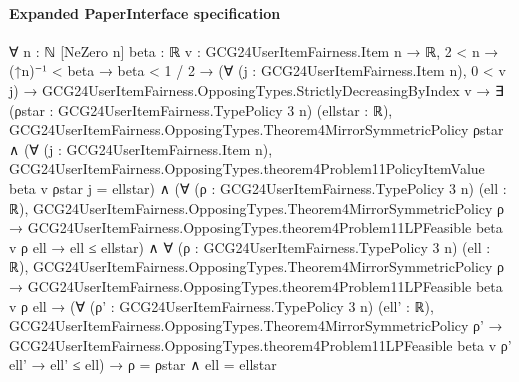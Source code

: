 \documentclass[10pt]{article}
\begin{document}
\paragraph{Expanded PaperInterface specification}
\begin{ReviewVerbatim}
∀ {n : ℕ} [NeZero n] {beta : ℝ} {v : GCG24UserItemFairness.Item n → ℝ},
  2 < n →
    (↑n)⁻¹ < beta →
      beta < 1 / 2 →
        (∀ (j : GCG24UserItemFairness.Item n), 0 < v j) →
          GCG24UserItemFairness.OpposingTypes.StrictlyDecreasingByIndex v →
            ∃ (ρstar : GCG24UserItemFairness.TypePolicy 3 n) (ellstar : ℝ),
              GCG24UserItemFairness.OpposingTypes.Theorem4MirrorSymmetricPolicy ρstar ∧
                (∀ (j : GCG24UserItemFairness.Item n),
                    GCG24UserItemFairness.OpposingTypes.theorem4Problem11PolicyItemValue beta v ρstar j = ellstar) ∧
                  (∀ (ρ : GCG24UserItemFairness.TypePolicy 3 n) (ell : ℝ),
                      GCG24UserItemFairness.OpposingTypes.Theorem4MirrorSymmetricPolicy ρ →
                        GCG24UserItemFairness.OpposingTypes.theorem4Problem11LPFeasible beta v ρ ell → ell ≤ ellstar) ∧
                    ∀ (ρ : GCG24UserItemFairness.TypePolicy 3 n) (ell : ℝ),
                      GCG24UserItemFairness.OpposingTypes.Theorem4MirrorSymmetricPolicy ρ →
                        GCG24UserItemFairness.OpposingTypes.theorem4Problem11LPFeasible beta v ρ ell →
                          (∀ (ρ' : GCG24UserItemFairness.TypePolicy 3 n) (ell' : ℝ),
                              GCG24UserItemFairness.OpposingTypes.Theorem4MirrorSymmetricPolicy ρ' →
                                GCG24UserItemFairness.OpposingTypes.theorem4Problem11LPFeasible beta v ρ' ell' →
                                  ell' ≤ ell) →
                            ρ = ρstar ∧ ell = ellstar
\end{ReviewVerbatim}
\end{document}
